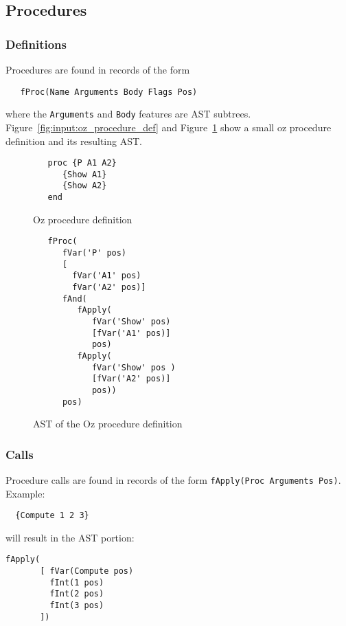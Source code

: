 \documentclass[a4paper]{memoir}
\begin{document}
\subsection{Procedures}\label{sec:input:procedures}
\subsubsection{Definitions}
Procedures are found in records of the form 
\begin{lstlisting}
   fProc(Name Arguments Body Flags Pos) 
\end{lstlisting}
where the \lstinline!Arguments! and \lstinline!Body! features are AST subtrees. 
Figure~\ref{fig:input:oz_procedure_def} and Figure~\ref{fig:input:ast_procedure_def} show a small oz procedure definition and its resulting AST.
\begin{figure}[ht]
\begin{lstlisting}
   proc {P A1 A2}
      {Show A1}
      {Show A2}
   end
\end{lstlisting}
\caption{Oz procedure definition}
\label{fig:input:oz_procedure_def}

\begin{lstlisting}
   fProc(
      fVar('P' pos)
      [
        fVar('A1' pos)
        fVar('A2' pos)]
      fAnd(
         fApply(
            fVar('Show' pos)
            [fVar('A1' pos)]
            pos)
         fApply(
            fVar('Show' pos )
            [fVar('A2' pos)]
            pos))
      pos)
\end{lstlisting}
\caption{AST of the Oz procedure definition}
\label{fig:input:ast_procedure_def}
\end{figure}



\subsubsection{Calls}
Procedure calls are found in records of the form 
\lstinline!fApply(Proc Arguments Pos)!. 
Example:

\begin{lstlisting}
  {Compute 1 2 3}
\end{lstlisting}

will result in the AST portion:
\begin{lstlisting}
fApply(
       [ fVar(Compute pos)
         fInt(1 pos)
         fInt(2 pos)
         fInt(3 pos)
       ])
\end{lstlisting}
\end{document}
